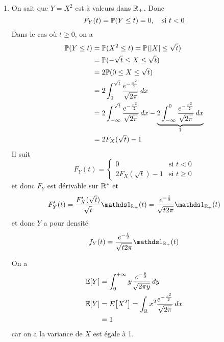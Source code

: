 {\begin{td-sol}[]
\begin{enumerate}
            \item On sait que \(Y = X^2\) est à valeurs dans \(\mathbb{R}_+\).
            Donc 
            \begin{equation*}
                F_Y(t) = \mathbb{P}(Y\leq t) = 0, \quad \text{si } t<0
            \end{equation*}
            Dans le cas où \(t\geq 0\), on a
            \begin{equation*}
                \begin{aligned}
                    \mathbb{P}(Y\leq t)
                    &= \mathbb{P}(X^2\leq t) = \mathbb{P}(\mathopen{}\left|X\right|\mathclose{}\leq \sqrt t)\\
                    &= \mathbb{P}(-\sqrt t\leq X\leq \sqrt t)\\
                    &= 2 \mathbb{P}(0\leq X\leq \sqrt t)\\
                    &= 2 \int_{0}^{\sqrt t} \frac{e^{-\frac{x^2}{2}}}{\sqrt{2\pi}} \mathop{}\!{d} x\\
                    &= 2 \int_{-\infty}^{\sqrt t} \frac{e^{-\frac{x^2}{2}}}{\sqrt{2\pi}} \mathop{}\!{d} x - \underbrace{2 \int_{-\infty}^{0} \frac{e^{-\frac{x^2}{2}}}{\sqrt{2\pi}} \mathop{}\!{d} x}_{1}\\
                    &= 2 F_X(\sqrt t) - 1
                \end{aligned}
            \end{equation*}
            Il suit
            \begin{equation*}
                F_Y(t) = \begin{cases}
                    0 & \text{si } t<0\\
                    2 F_X(\sqrt t) - 1 & \text{si } t\geq 0
                \end{cases}
            \end{equation*}
            et donc \(F_Y\) est dérivable sur \(\mathbb{R}^*\) et
            \begin{equation*}
                F_Y'(t) = \frac{F_X'(\sqrt t)}{\sqrt t} \one_{\bb R_+}(t) = \frac{e^{-\frac{t}{2}}}{\sqrt{t2\pi}} \one_{\bb R_+}(t)
            \end{equation*}
            et donc \(Y\) a pour densité
            \begin{equation*}
                f_Y(t) = \frac{e^{-\frac{t}{2}}}{\sqrt{t2\pi}} \one_{\bb R_+}(t)
            \end{equation*}

            On a
            \begin{equation*}
                \begin{aligned}
                    \mathbb{E}\mathopen{}\left[Y\right]\mathclose{} 
                    &= \int_0^{+\infty} y \frac{e^{-\frac{y}{2}}}{\sqrt{2\pi y}} \mathop{}\!{d} y\\
                    \mathbb{E}\mathopen{}\left[Y\right]\mathclose{}
                    &= E\mathopen{}\left[X^2\right]\mathclose{} = \int_{\mathbb{R}} x^2 \frac{e^{-\frac{x^2}{2}}}{\sqrt{2\pi}} \mathop{}\!{d} x\\
                    &= 1
                \end{aligned}
            \end{equation*}
            car on a la variance de \(X\) est égale à 1.


\end{enumerate}
\end{td-sol}}
